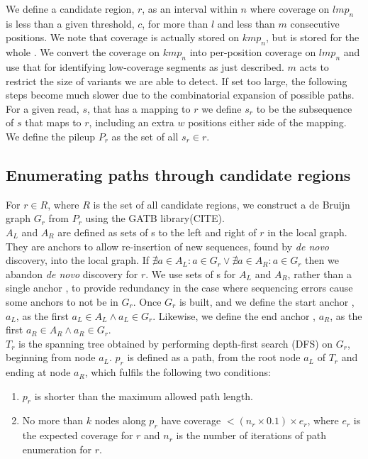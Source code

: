 We define a candidate region, $r$, as an interval within $n$ where coverage on $lmp_n$ is less than a given threshold, $c$, for more than $l$ and less than $m$ consecutive positions. We note that coverage is actually stored on $kmp_n$, but is stored for the whole \kmer{}. We convert the coverage on $kmp_n$ into per-position coverage on $lmp_n$ and use that for identifying low-coverage segments as just described. $m$ acts to restrict the size of variants we are able to detect. If set too large, the following steps become much slower due to the combinatorial expansion of possible paths. \\
For a given read, $s$, that has a mapping to $r$ we define $s_r$ to be the subsequence of $s$ that maps to $r$, including an extra $w$ positions either side of the mapping. We define the pileup $P_r$ as the set of all $s_r \in r$.

\subsection{Enumerating paths through candidate regions}

For $r \in R$, where $R$ is the set of all candidate regions, we construct a de Bruijn graph $G_r$ from $P_r$ using the GATB library(CITE). \\
$A_L$ and $A_R$ are defined as sets of \kmer{}s to the left and right of $r$ in the local graph. They are anchors to allow re-insertion of new sequences, found by \textit{de novo} discovery, into the local graph. If  $\nexists a \in A_L : a \in G_r \lor \nexists a \in A_R : a \in G_r$ then we abandon \textit{de novo} discovery for $r$. We use sets of \kmer{}s for $A_L$ and $A_R$, rather than a single anchor \kmer{}, to provide redundancy in the case where sequencing errors cause some anchors to not be in $G_r$. Once $G_r$ is built, and we define the start anchor \kmer{}, $a_L$, as the first $a_L \in A_L \land a_L \in G_r$. Likewise, we define the end anchor \kmer{}, $a_R$, as the first $a_R \in A_R \land a_R \in G_r$.\\

$T_r$ is the spanning tree obtained by performing depth-first search (DFS) on $G_r$, beginning from node $a_L$. $p_r$ is defined as a path, from the root node $a_L$ of $T_r$ and ending at node $a_R$, which fulfils the following two conditions:

\begin{enumerate}
  \item $p_r$ is shorter than the maximum allowed path length.
  \item No more than $k$ nodes along $p_r$ have coverage $< (n_r \times 0.1) \times e_r$, where $e_r$ is the expected \kmer{} coverage for $r$ and $n_r$ is the number of iterations of path enumeration for $r$.
\end{enumerate}

